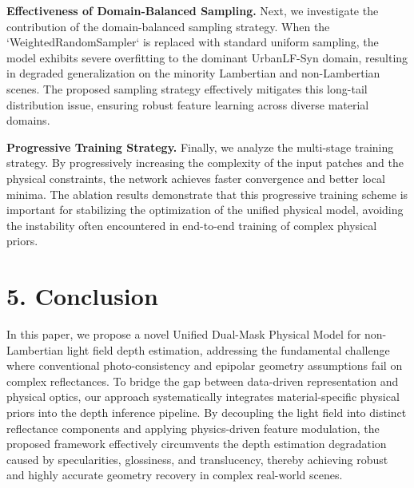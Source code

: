 \documentclass[lettersize,journal]{IEEEtran}
\begin{document}
{\textbf{Effectiveness of Domain-Balanced Sampling.}
Next, we investigate the contribution of the domain-balanced sampling strategy. When the `WeightedRandomSampler` is replaced with standard uniform sampling, the model exhibits severe overfitting to the dominant UrbanLF-Syn domain, resulting in degraded generalization on the minority Lambertian and non-Lambertian scenes. The proposed sampling strategy effectively mitigates this long-tail distribution issue, ensuring robust feature learning across diverse material domains.

\textbf{Progressive Training Strategy.}
Finally, we analyze the multi-stage training strategy. By progressively increasing the complexity of the input patches and the physical constraints, the network achieves faster convergence and better local minima. The ablation results demonstrate that this progressive training scheme is important for stabilizing the optimization of the unified physical model, avoiding the instability often encountered in end-to-end training of complex physical priors.

\section{5. Conclusion}


In this paper, we propose a novel Unified Dual-Mask Physical Model for non-Lambertian light field depth estimation, addressing the fundamental challenge where conventional photo-consistency and epipolar geometry assumptions fail on complex reflectances. To bridge the gap between data-driven representation and physical optics, our approach systematically integrates material-specific physical priors into the depth inference pipeline. By decoupling the light field into distinct reflectance components and applying physics-driven feature modulation, the proposed framework effectively circumvents the depth estimation degradation caused by specularities, glossiness, and translucency, thereby achieving robust and highly accurate geometry recovery in complex real-world scenes.

}
\end{document}
